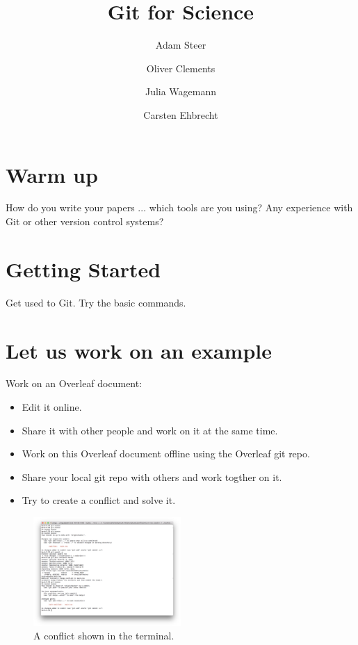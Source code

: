 \documentclass[fleqn,10pt]{wlscirep}
\title{Git for Science}
\author[1,*]{Adam Steer}
\author[2]{Oliver Clements}
\author[2]{Julia Wagemann}
\author[3]{Carsten Ehbrecht}
\affil[1]{NCI, Australia}
\affil[2]{PML, UK}
\affil[3]{DKRZ, Germany}
\begin{document}
\flushbottom
\maketitle

\thispagestyle{empty}

\section*{Warm up}

How do you write your papers ... which tools are you using? Any experience with Git or other version control systems?

\section*{Getting Started}

Get used to Git. Try the basic commands.

\section*{Let us work on an example}

Work on an Overleaf document:

\begin{itemize}
  \item Edit it online.
  \item Share it with other people and work on it at the same time.
  \item Work on this Overleaf document offline using the Overleaf git repo.
  \item Share your local git repo with others and work togther on it.
  \item Try to create a conflict and solve it.
\end{itemize}


\begin{figure}[ht]
\caption{A conflict shown in the terminal.}
\centering
\includegraphics[width=0.5\textwidth]{terminal-conflict}
\end{figure}
\end{document}
